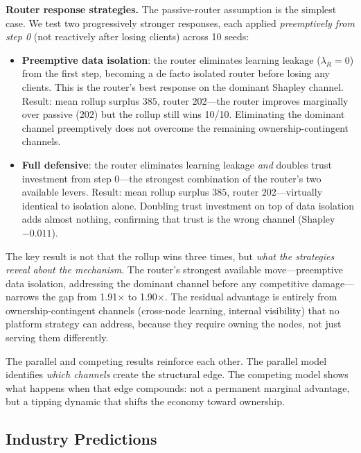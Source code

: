 \documentclass[12pt]{article}
\theoremstyle{definition}
\begin{document}
\textbf{Router response strategies.} The passive-router assumption is the simplest case. We test two progressively stronger responses, each applied \textit{preemptively from step 0} (not reactively after losing clients) across 10 seeds:

\begin{itemize}[leftmargin=*]
\item \textbf{Preemptive data isolation}: the router eliminates learning leakage ($\lambda_R = 0$) from the first step, becoming a de facto isolated router before losing any clients. This is the router's best response on the dominant Shapley channel. Result: mean rollup surplus $385$, router $202$---the router improves marginally over passive ($202$) but the rollup still wins 10/10. Eliminating the dominant channel preemptively does not overcome the remaining ownership-contingent channels.

\item \textbf{Full defensive}: the router eliminates learning leakage \textit{and} doubles trust investment from step 0---the strongest combination of the router's two available levers. Result: mean rollup surplus $385$, router $202$---virtually identical to isolation alone. Doubling trust investment on top of data isolation adds almost nothing, confirming that trust is the wrong channel (Shapley $-0.011$).
\end{itemize}

\noindent The key result is not that the rollup wins three times, but \textit{what the strategies reveal about the mechanism}. The router's strongest available move---preemptive data isolation, addressing the dominant channel before any competitive damage---narrows the gap from 1.91$\times$ to 1.90$\times$. The residual advantage is entirely from ownership-contingent channels (cross-node learning, internal visibility) that no platform strategy can address, because they require owning the nodes, not just serving them differently.

The parallel and competing results reinforce each other. The parallel model identifies \textit{which channels} create the structural edge. The competing model shows what happens when that edge compounds: not a permanent marginal advantage, but a tipping dynamic that shifts the economy toward ownership.

\subsection{Industry Predictions}
\label{sec:industries}
\end{document}
